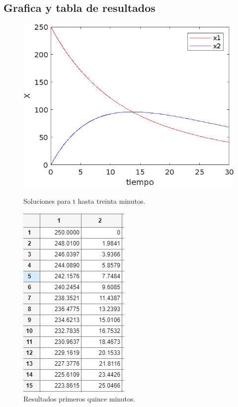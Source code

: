 \documentclass[titlepage]{article}
\begin{document}
        \subsection{Grafica y tabla de resultados}
        \begin{figure}[ht]
                    \begin{center}
                    \includegraphics[scale=0.6]{Grafica30min} 
                \caption{Soluciones para t hasta treinta minutos.}
                \end{center}
                                        
                \begin{center}
                    \includegraphics[scale=0.5]{Tabla1} 
                \caption{Resultados primeros quince minutos.}
                \end{center}
                
                \end{figure}
                
\end{document}
